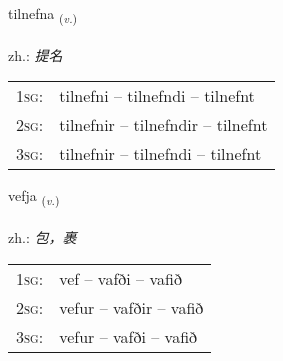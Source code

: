\documentclass[frontgrid, backgrid]{flacards}\usepackage[]{graphicx}\usepackage[]{xcolor}
\begin{document}
\renewcommand{\flhead}{\vskip5pt \fboxsep=0pt {\small\bfseries\footnotesize Sagnorð | 动词}}
\renewcommand{\fcfoot}{\vskip5pt \fboxsep=0pt \hspace{2pt}{\small\bfseries\footnotesize 3K}}

\renewcommand{\blhead}{\vskip5pt {\small\bfseries\footnotesize Sagnorð | 动词 }}
\renewcommand{\bcfoot}{\vskip5pt \hspace{2pt}{\small\bfseries\footnotesize 3K}}


{tilnefna \small{\textsubscript{(\textit{v.})}} \\[1ex] %
\textphonetic{[tʰɪlnɛpna]} \\
zh.: \emph{提名} \\  [2ex]
\renewcommand*{\arraystretch}{0.8}
\begin{tabular}{p{1cm}l}
\textsc{1sg}: & tilnefni -- tilnefndi -- tilnefnt \\ 
\textsc{2sg}: & tilnefnir -- tilnefndir -- tilnefnt \\ 
\textsc{3sg}: & tilnefnir -- tilnefndi -- tilnefnt \\ 
\end{tabular}
}

\renewcommand{\flhead}{\vskip5pt \fboxsep=0pt {\small\bfseries\footnotesize Sagnorð | 动词}}
\renewcommand{\fcfoot}{\vskip5pt \fboxsep=0pt \hspace{2pt}{\small\bfseries\footnotesize 3K}}

\renewcommand{\blhead}{\vskip5pt {\small\bfseries\footnotesize Sagnorð | 动词 }}
\renewcommand{\bcfoot}{\vskip5pt \hspace{2pt}{\small\bfseries\footnotesize 3K}}


{vefja \small{\textsubscript{(\textit{v.})}} \\[1ex] %
\textphonetic{[vɛvja]} \\
zh.: \emph{包，裹} \\  [2ex]
\renewcommand*{\arraystretch}{0.8}
\begin{tabular}{p{1cm}l}
\textsc{1sg}: & vef -- vafði -- vafið \\ 
\textsc{2sg}: & vefur -- vafðir -- vafið \\ 
\textsc{3sg}: & vefur -- vafði -- vafið \\ 
\end{tabular}
}
\end{document}

